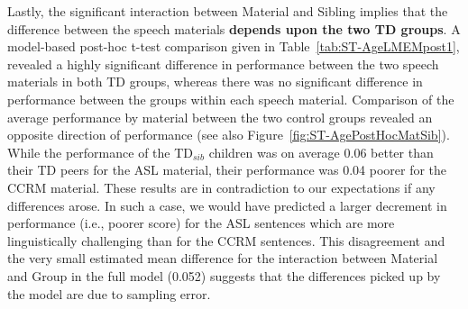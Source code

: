 \documentclass[a4paper, twoside]{templates/ociamthesis}
\begin{document}
Lastly, the significant interaction between Material and Sibling implies that the difference between the speech materials \textbf{depends upon the two TD groups}. A model-based post-hoc t-test comparison given in Table~\ref{tab:ST-AgeLMEMpost1}, revealed a highly significant difference in performance between the two speech materials in both TD groups, whereas there was no significant difference in performance between the groups within each speech material. Comparison of the average performance by material between the two control groups revealed an opposite direction of performance (see also Figure~\ref{fig:ST-AgePostHocMatSib}). While the performance of the TD\(_{sib}\) children was on average 0.06 better than their TD peers for the ASL material, their performance was 0.04 poorer for the CCRM material. These results are in contradiction to our expectations if any differences arose. In such a case, we would have predicted a larger decrement in performance (i.e., poorer score) for the ASL sentences which are more linguistically challenging than for the CCRM sentences. This disagreement and the very small estimated mean difference for the interaction between Material and Group in the full model (0.052) suggests that the differences picked up by the model are due to sampling error.\\



\begin{table}

\caption{\label{tab:ST-AgeLMEMpost1}ST: Age-effect: post-hoc paired-comparison t-tests for Material (ASL/CCRM) x Sibling (TD/TD\(_{sib}\)) interaction. The test was performed on the fitted LMEM model and included adjusted least-squared-mean for the random intercepts (subjects) using lsmeans package \autocite[emmeans package;][]{emmeansPackageR}.}
\centering
{}
\end{table}
\end{document}
